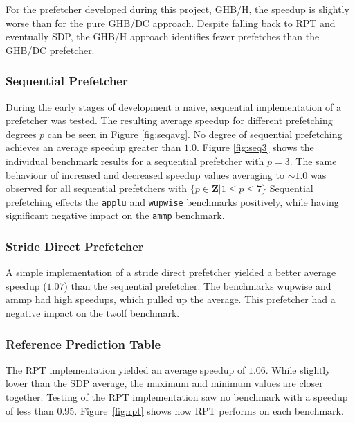 For the prefetcher developed during this project, GHB/H, the speedup is slightly
worse than for the pure GHB/DC approach.
Despite falling back to RPT and eventually SDP, the GHB/H approach identifies
fewer prefetches than the GHB/DC prefetcher.





\subsubsection{Sequential Prefetcher}
During the early stages of development a naive, sequential implementation of a prefetcher was tested.
The resulting average speedup for different prefetching degrees $p$ can be seen in Figure \ref{fig:seqavg}.
No degree of sequential prefetching achieves an average speedup greater than $1.0$.
Figure \ref{fig:seq3} shows the individual benchmark results for a sequential prefetcher with $p = 3$.
The same behaviour of increased and decreased speedup values averaging to $\sim 1.0$ was observed for all sequential prefetchers with $\{p \in \mathbf{Z} | 1 \leq p \leq 7\}$
Sequential prefetching effects the \texttt{applu} and \texttt{wupwise} benchmarks positively, while having significant negative impact on the \texttt{ammp} benchmark.

\begin{figure*}
  
  \caption{Average speedup as a function of degree for the sequential prefetcher.}
  \label{fig:seqavg}
\end{figure*}

\begin{figure*}
  
  \caption{Performance of sequential prefetcher with $p = 3$ across benchmarks.}
  \label{fig:seq3}
\end{figure*}

\subsubsection{Stride Direct Prefetcher}
A simple implementation of a stride direct prefetcher yielded a better average speedup ($1.07$) than the sequential prefetcher.
The benchmarks wupwise and ammp had high speedups, which pulled up the average.
This prefetcher had a negative impact on the twolf benchmark.


\subsubsection{Reference Prediction Table}
The RPT implementation yielded an average speedup of $1.06$.
While slightly lower than the SDP average, the maximum and minimum values are closer together.
Testing of the RPT implementation saw no benchmark with a speedup of less than $0.95$.
Figure~\ref{fig:rpt} shows how RPT performs on each benchmark.

